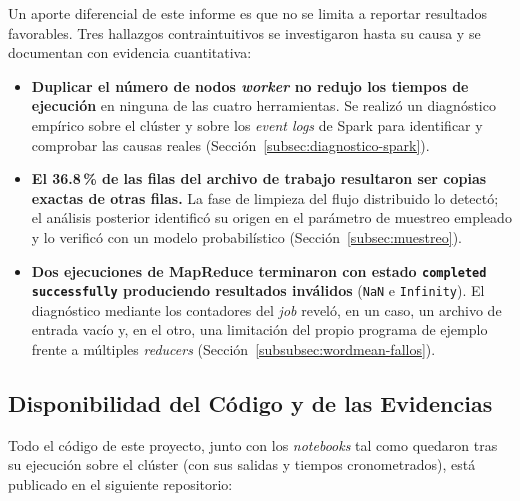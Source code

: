 Un aporte diferencial de este informe es que no se limita a reportar resultados favorables. Tres hallazgos contraintuitivos se investigaron hasta su causa y se documentan con evidencia cuantitativa:

\begin{itemize}[leftmargin=*]
    \item \textbf{Duplicar el número de nodos \textit{worker} no redujo los tiempos de ejecución} en ninguna de las cuatro herramientas. Se realizó un diagnóstico empírico sobre el clúster y sobre los \textit{event logs} de Spark para identificar y comprobar las causas reales (Sección~\ref{subsec:diagnostico-spark}).
    \item \textbf{El 36.8\,\% de las filas del archivo de trabajo resultaron ser copias exactas de otras filas.} La fase de limpieza del flujo distribuido lo detectó; el análisis posterior identificó su origen en el parámetro de muestreo empleado y lo verificó con un modelo probabilístico (Sección~\ref{subsec:muestreo}).
    \item \textbf{Dos ejecuciones de MapReduce terminaron con estado \texttt{completed successfully} produciendo resultados inválidos} (\texttt{NaN} e \texttt{Infinity}). El diagnóstico mediante los contadores del \textit{job} reveló, en un caso, un archivo de entrada vacío y, en el otro, una limitación del propio programa de ejemplo frente a múltiples \textit{reducers} (Sección~\ref{subsubsec:wordmean-fallos}).
\end{itemize}


\subsection*{Disponibilidad del Código y de las Evidencias}

Todo el código de este proyecto, junto con los \textit{notebooks} tal como quedaron tras su ejecución sobre el clúster (con sus salidas y tiempos cronometrados), está publicado en el siguiente repositorio:

\begin{center}
\end{center}

